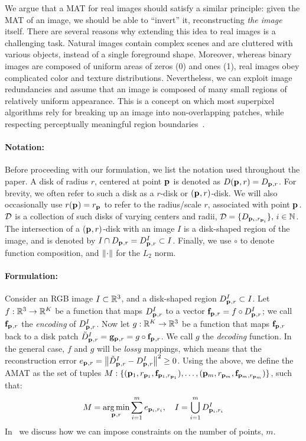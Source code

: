 \documentclass[10pt,twocolumn,letterpaper]{article}
\begin{document}
We argue that a MAT for real images should satisfy a similar principle: given the MAT of an image, 
we should be able to ``invert'' it, reconstructing \emph{the image} itself.
There are several reasons why extending this idea to real images is a challenging task. 
Natural images contain complex scenes and are cluttered with various objects, instead of a single foreground shape.
Moreover, whereas binary images are composed of uniform areas of zeros (0) and ones (1), 
real images obey complicated color and texture distributions.
Nevertheless, we can exploit image redundancies and assume that an image is composed of many small regions of 
relatively uniform appearance.
This is a concept on which most superpixel algorithms rely for breaking up an image 
into non-overlapping patches, while respecting perceptually meaningful region 
boundaries~\cite{shi2000normalized,levinshtein2009turbopixels,achanta2012slic}. 
\paragraph{Notation:} Before proceeding with our formulation, we list the notation used throughout the paper.
A disk of radius $r$, centered at point $\mathbf{p}_{}$ is denoted as $D(\mathbf{p}_{},r)=D_{\mathbf{p}_{},r}$. 
For brevity, we often refer to such a disk as a $r$-disk or $(\mathbf{p}_{},r)$-disk.
We will also occasionally use $r(\mathbf{p}_{}) = r_{\mathbf{p}_{}}$ to refer to the radius/scale $r$, associated with point $\mathbf{p}_{}$.
$\mathcal{D}$ is a collection of such disks of varying centers and radii, $\mathcal{D}=\{ D_{\mathbf{p}_{i},r_{\mathbf{p}_{i}}} \},\, i\in\mathbb{N}$.
The intersection of a $(\mathbf{p}_{},r)$-disk with an image $I$ is a disk-shaped region of the image, and is denoted by 
$I \cap D_{\mathbf{p}_{},r}=D_{\mathbf{p}_{},r}^I \subset I$. Finally, we use $\circ$ to denote function composition, and $\left \lVert \cdot \right \rVert$
for the $L_2$ norm.

\paragraph{Formulation:} Consider an RGB image $I\subset\mathbb{R}^3$, and a disk-shaped region $D_{\mathbf{p}_{},r}^I \subset I$.
Let $f:\mathbb{R}^3 \rightarrow \mathbb{R}^K$ be a function that maps $D_{\mathbf{p}_{},r}^I$ to a vector  $\mathbf{f}_{\mathbf{p}_{},r}=f\circ D_{\mathbf{p}_{},r}^I$; 
we call $\mathbf{f}_{\mathbf{p}_{},r}$ the \emph{encoding} of $D_{\mathbf{p}_{},r}^I$. 
Now let $g:\mathbb{R}^K \rightarrow \mathbb{R}^3$ be a function that maps $\mathbf{f}_{\mathbf{p}_{},r}$ back to a disk patch 
$\tilde{D}_{\mathbf{p}_{},r}^I = \mathbf{g}_{\mathbf{p}_{},r} = g \circ \mathbf{f}_{\mathbf{p}_{},r}$. We call $g$ the \emph{decoding} function.
In the general case, $f$ and $g$ will be \emph{lossy} mappings, which means that the reconstruction error 
$e_{\mathbf{p}_{},r} = \left \lVert  \tilde{D}_{\mathbf{p}_{},r}^I - D_{\mathbf{p}_{},r}^I \right \rVert^2 \geq 0$. 
Using the above, we define the AMAT as the set of tuples 
$M:\{ ( \mathbf{p}_{1},r_{\mathbf{p}_{1}}, \mathbf{f}_{\mathbf{p}_{1},r_{\mathbf{p}_{1}}} ), \ldots, ( \mathbf{p}_{m},r_{\mathbf{p}_{m}}, \mathbf{f}_{\mathbf{p}_{m},r_{\mathbf{p}_{m}}} ) \}$, such that:
\begin{equation}
M = \operatorname*{arg\,min}_{\mathbf{p}_{},r}{\sum_{i=1}^m e_{\mathbf{p}_{i},r_i}},\quad I=\bigcup_{i=1}^m D_{\mathbf{p}_{i},r_i}^I 
\label{eq:minimization}
\end{equation}
In~ we discuss how we can impose constraints on the number of points, $m$.
\end{document}

